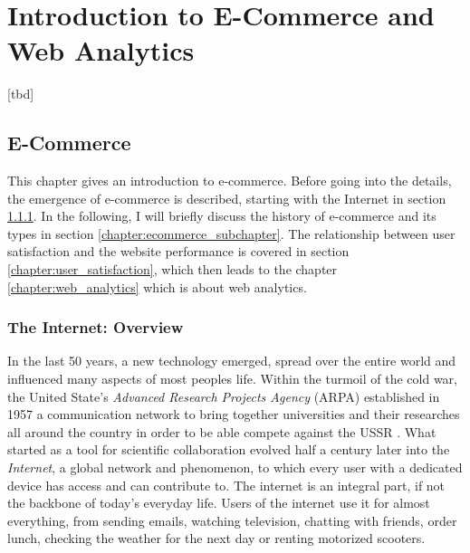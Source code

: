 
\chapter{Introduction to E-Commerce and Web Analytics}

[tbd]







\section{E-Commerce}
\label{chapter:e-commerce}

This chapter gives an introduction to e-commerce.
Before going into the details, the emergence of e-commerce is described, starting with the Internet in section \ref{chapter:internet}.
In the following, I will briefly discuss the history of e-commerce and its types in section \ref{chapter:ecommerce_subchapter}.
The relationship between user satisfaction and the website performance is covered in section \ref{chapter:user_satisfaction}, which then leads to the chapter \ref{chapter:web_analytics} which is about web analytics.



\subsection{The Internet: Overview}
\label{chapter:internet}

In the last 50 years, a new technology emerged, spread over the entire world and influenced many aspects of most peoples life.
Within the turmoil of the cold war, the United State's \textit{Advanced Research Projects Agency} (ARPA) established in 1957 a communication network to bring together universities and their researches all around the country in order to be able compete against the USSR \cite{2011Cohen}.
What started as a tool for scientific collaboration evolved half a century later into the \textit{Internet}, a global network and phenomenon, to which every user with a dedicated device has access and can contribute to.
The internet is an integral part, if not the backbone of today's everyday life.
Users of the internet use it for almost everything, from sending emails, watching television, chatting with friends,  order lunch, checking the weather for the next day or renting motorized scooters.

